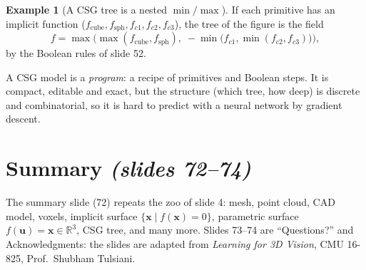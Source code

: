 \documentclass[11pt,a4paper]{article}
\newcommand{\R}{\mathbb{R}}
\newcommand{\vx}{\bm{x}}
\newcommand{\vu}{\bm{u}}
\theoremstyle{definition}
\newtheorem{example}[definition]{Example}
\theoremstyle{plain}
\theoremstyle{remark}
\newcommand{\slides}[1]{\texorpdfstring{\emph{(#1)}}{(#1)}}
\begin{document}
\begin{example}[A CSG tree is a nested $\min/\max$]
If each primitive has an implicit function ($f_{\text{cube}},f_{\text{sph}},f_{c1},f_{c2},f_{c3}$), the tree of the figure is the field
\[
f=\max\Big(\max(f_{\text{cube}},f_{\text{sph}}),\;-\min\big(f_{c1},\min(f_{c2},f_{c3})\big)\Big),
\]
by the Boolean rules of slide 52.
\end{example}

\begin{intuition}
A CSG model is a \emph{program}: a recipe of primitives and Boolean steps. It is compact, editable and exact, but the structure (which tree, how deep) is discrete and combinatorial, so it is hard to predict with a neural network by gradient descent.
\end{intuition}

\section{Summary \slides{slides 72--74}}\label{sec:summary}

The summary slide (72) repeats the zoo of slide 4: mesh, point cloud, CAD model, voxels, implicit surface $\{\vx\mid f(\vx)=0\}$, parametric surface $f(\vu)=\vx\in\R^3$, CSG tree, and many more. Slides 73--74 are ``Questions?'' and Acknowledgments: the slides are adapted from \emph{Learning for 3D Vision}, CMU 16-825, Prof.\ Shubham Tulsiani.
\end{document}
